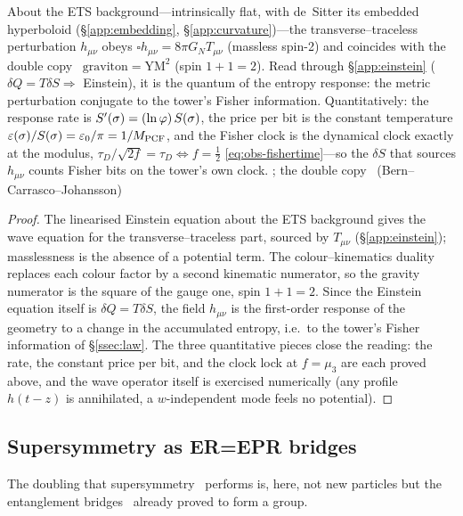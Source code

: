\begin{theorem}\label{thm:graviton}
About the ETS background---intrinsically flat, with de~Sitter its embedded hyperboloid
(\S\ref{app:embedding}, \S\ref{app:curvature})---the transverse--traceless perturbation $h_{\mu\nu}$
obeys $\square h_{\mu\nu}=8\pi G_N T_{\mu\nu}$ (massless spin-2) and coincides with the double copy~\cite{BCJ} $\text{graviton}=\text{YM}^2$ (spin $1+1=2$).
Read through \S\ref*{app:einstein} ($\delta Q=T\delta S\Rightarrow$ Einstein), it is the quantum
of the entropy response: the metric perturbation conjugate to the tower's Fisher information.
Quantitatively: the response rate is $S'(\sigma)=(\ln\varphi)\,S(\sigma)$, the price per bit is the
constant temperature $\varepsilon(\sigma)/S(\sigma)=\varepsilon_0/\pi=1/M_{\mathrm{PCF}}$, and the Fisher clock
is the dynamical clock exactly at the modulus, $\tau_D/\sqrt{2f}=\tau_D\iff f=\tfrac12$
\eqref{eq:obs-fishertime}---so the $\delta S$ that sources $h_{\mu\nu}$ counts Fisher bits on the
tower's own clock.
; the double copy~\cite{BCJ} (Bern--Carrasco--Johansson)


\end{theorem}
\begin{proof}
The linearised Einstein equation about the ETS background gives the wave equation for the
transverse--traceless part, sourced by $T_{\mu\nu}$ (\S\ref*{app:einstein}); masslessness is the
absence of a potential term. The colour--kinematics duality replaces each colour factor by a
second kinematic numerator, so the gravity numerator is the square of the gauge one, spin
$1+1=2$. Since the Einstein equation itself is $\delta Q=T\delta S$, the field $h_{\mu\nu}$ is the
first-order response of the geometry to a change in the accumulated entropy, i.e.\ to the tower's
Fisher information of \S\ref{ssec:law}. The three quantitative pieces close the reading: the rate,
the constant price per bit, and the clock lock at $f=\mu_3$ are each proved above, and the wave
operator itself is exercised numerically (any profile $h(t{-}z)$ is annihilated, a $w$-independent
mode feels no potential).
\end{proof}

\subsection{Supersymmetry as ER=EPR bridges}\label{ssec:susy}
The doubling that supersymmetry~\cite{Martin} performs is, here, not new particles but the entanglement bridges~\cite{MaldacenaSusskind13} already proved to form a group.


